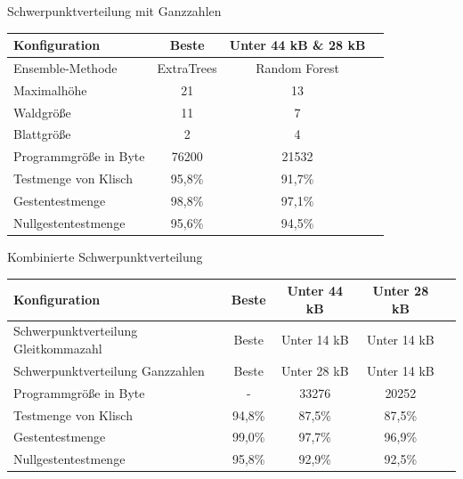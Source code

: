 \documentclass[10pt]{beamer}
\begin{document}
\begin{frame}{Schwerpunktverteilung mit Ganzzahlen}
    \centering
    \begin{tabular}{ | l | c | c | c |}
        \hline
        Konfiguration & Beste & Unter 44 kB \& 28 kB \\\hline
        Ensemble-Methode & ExtraTrees & Random Forest \\\hline
        Maximalhöhe & 21 & 13 \\\hline
        Waldgröße & 11 & 7 \\\hline
        Blattgröße & 2 & 4 \\\hline
        Programmgröße in Byte & 76200 & 21532 \\\hline
        Testmenge von Klisch & 95,8\% & 91,7\% \\\hline
        Gestentestmenge & 98,8\% & 97,1\% \\\hline
        Nullgestentestmenge & 95,6\% & 94,5\% \\\hline
    \end{tabular}
\end{frame}

\begin{frame}{Kombinierte Schwerpunktverteilung}
    \centering
    \begin{tabular}{ | p{4cm} | c | c | c | c |}
        \hline
        Konfiguration & Beste & Unter 44 kB & Unter 28 kB \\\hline
        Schwerpunktverteilung Gleitkommazahl & Beste & Unter 14 kB & Unter 14 kB \\\hline
        Schwerpunktverteilung Ganzzahlen & Beste &  Unter 28 kB & Unter 14 kB \\\hline
        Programmgröße in Byte & - & 33276 & 20252 \\\hline
        Testmenge von Klisch & 94,8\% & 87,5\% & 87,5\% \\\hline
        Gestentestmenge & 99,0\% & 97,7\% & 96,9\% \\\hline
        Nullgestentestmenge & 95,8\% & 92,9\% & 92,5\% \\\hline
    \end{tabular}
\end{frame}
\end{document}
